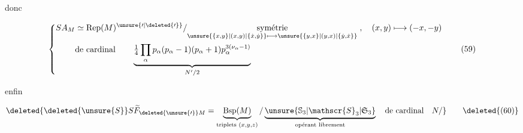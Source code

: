 donc

\[
\left\{\begin{aligned}
SA_M&\simeq\operatorname{Rep}(M)^{\unsure{\prime|\deleted{\prime}}}/
\underset{\scriptstyle\unsure{\{x,y\}|\left(x,y\right)|\{\dot{x},\dot{y}\}}\longmapsto\unsure{\{y,x\}|\left(y,x\right)|\{\dot{y},\dot{x}\}}}{\text{symétrie}}\;,\quad(x,y)\longmapsto(-x,-y)\\
&\text{de cardinal}\qquad\underbrace{\tfrac14\prod_\alpha p_\alpha(p_\alpha-1)(p_\alpha+1)p_\alpha^{3(\nu_\alpha-1)}}_{N'/2}
\end{aligned}\right.\tag*{(59)}
\]

enfin

\[
\deleted{\deleted{\unsure{S}}S\widetilde{F}_{\deleted{\unsure{\prime}}M}=\underbrace{\mathrm{Bsp}(M)}_{\text{triplets }(x,y,z)}/\underbrace{\unsure{\mathbb{S}_3|\mathscr{S}_3|\mathfrak{S}_3}}_{\text{opérant librement}}\quad\text{de cardinal}\quad N/}\tag*{\deleted{(60)}}
\]

